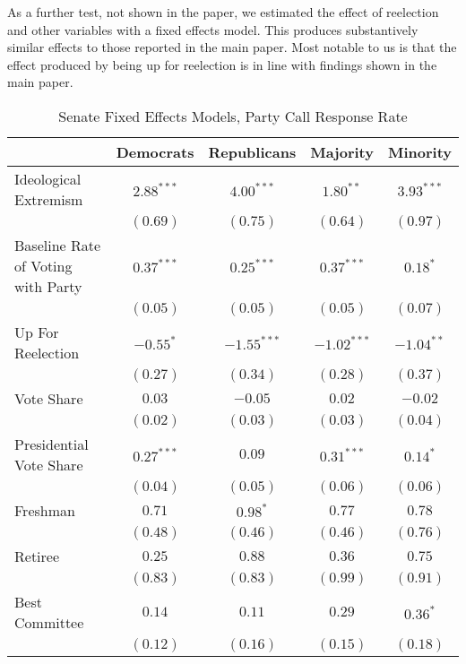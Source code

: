 \documentclass[12pt]{article}
\begin{document}
As a further test, not shown in the paper, we estimated the effect of reelection and other variables with a fixed effects model. This produces substantively similar effects to those reported in the main paper. Most notable to us is that the effect produced by being up for reelection is in line with findings shown in the main paper.

\begin{table}[H]
	\begin{center}
		\caption{Senate Fixed Effects Models, Party Call Response Rate}
		\begin{tabular}{l c c c c }
			\hline
			& Democrats & Republicans & Majority & Minority \\
			\hline
			Ideological Extremism  & $2.88^{***}$ & $4.00^{***}$  & $1.80^{**}$   & $3.93^{***}$ \\
			& $(0.69)$     & $(0.75)$      & $(0.64)$      & $(0.97)$     \\
			Baseline Rate of Voting with Party               & $0.37^{***}$ & $0.25^{***}$  & $0.37^{***}$  & $0.18^{*}$   \\
			& $(0.05)$     & $(0.05)$      & $(0.05)$      & $(0.07)$     \\
			Up For Reelection     & $-0.55^{*}$  & $-1.55^{***}$ & $-1.02^{***}$ & $-1.04^{**}$ \\
			& $(0.27)$     & $(0.34)$      & $(0.28)$      & $(0.37)$     \\
			Vote Share             & $0.03$       & $-0.05$       & $0.02$        & $-0.02$      \\
			& $(0.02)$     & $(0.03)$      & $(0.03)$      & $(0.04)$     \\
			Presidential Vote Share       & $0.27^{***}$ & $0.09$        & $0.31^{***}$  & $0.14^{*}$   \\
			& $(0.04)$     & $(0.05)$      & $(0.06)$      & $(0.06)$     \\
			Freshman                & $0.71$       & $0.98^{*}$    & $0.77$        & $0.78$       \\
			& $(0.48)$     & $(0.46)$      & $(0.46)$      & $(0.76)$     \\
			Retiree                 & $0.25$       & $0.88$        & $0.36$        & $0.75$       \\
			& $(0.83)$     & $(0.83)$      & $(0.99)$      & $(0.91)$     \\
			Best Committee         & $0.14$       & $0.11$        & $0.29$        & $0.36^{*}$   \\
			& $(0.12)$     & $(0.16)$      & $(0.15)$      & $(0.18)$     \\

\end{tabular}
\end{center}
\end{table}
\end{document}
